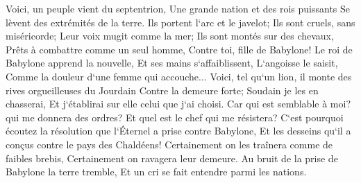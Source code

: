 \verse Voici, un peuple vient du septentrion, Une grande nation et des rois puissants Se lèvent des extrémités de la terre. 
\verse Ils portent l`arc et le javelot; Ils sont cruels, sans miséricorde; Leur voix mugit comme la mer; Ils sont montés sur des chevaux, Prêts à combattre comme un seul homme, Contre toi, fille de Babylone! 
\verse Le roi de Babylone apprend la nouvelle, Et ses mains s`affaiblissent, L`angoisse le saisit, Comme la douleur d`une femme qui accouche... 
\verse Voici, tel qu`un lion, il monte des rives orgueilleuses du Jourdain Contre la demeure forte; Soudain je les en chasserai, Et j`établirai sur elle celui que j`ai choisi. Car qui est semblable à moi? qui me donnera des ordres? Et quel est le chef qui me résistera? 
\verse C`est pourquoi écoutez la résolution que l`Éternel a prise contre Babylone, Et les desseins qu`il a conçus contre le pays des Chaldéens! Certainement on les traînera comme de faibles brebis, Certainement on ravagera leur demeure. 
\verse Au bruit de la prise de Babylone la terre tremble, Et un cri se fait entendre parmi les nations. 

\chapter{}

